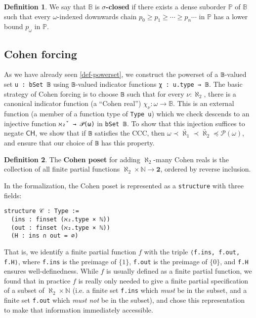 \documentclass[sigplan,10pt,review, anonymous]{acmart}
\newcommand{\B}{\mathbb{B}}
\newcommand{\lil}{\lstinline}
\newcommand{\CH}{\mathsf{CH}}
\theoremstyle{definition}
\newtheorem{defn}{Definition}[section]
\begin{document}
\begin{defn}\label{def-sigma-closed}
We say that \(\B\) is \textbf{\(\sigma\)-closed} if there exists a dense suborder \(\mathbb{P}\) of \(\B\) such that every \(\omega\)-indexed downwards chain \(p_0 \geq p_1 \geq \cdots \geq p_n \cdots\) in \(\mathbb{P}\) has a lower bound \(p_{\omega}\) in \(\mathbb{P}\).
\end{defn}

\subsection{Cohen forcing}

As we have already seen \ref{def-powerset}, we construct the powerset of a \lil{𝔹}-valued set \lstinline{u : bSet 𝔹} using \lil{𝔹}-valued indicator functions \lil{χ : u.type → 𝔹}. The basic strategy of Cohen forcing is to choose \lil{𝔹} such that for every \(\nu : \aleph_2\), there is a canonical indicator function (a ``Cohen real'') \(\chi_{\nu} : \omega \to \mathbb{B}\). This is an external function (a member of a function type of \lstinline{Type u}) which we check descends to an injective function \lil{ℵ₂̌  → 𝒫(ω)} in \lil{bSet 𝔹}. To show that this injection suffices to negate \(\CH\), we show that if \lil{𝔹} satisfies the CCC, then \(\omega \prec \check{\aleph_1} \prec \check{\aleph_2} \preceq \mathcal{P}(\omega)\), and ensure that our choice of \lil{𝔹} has this property.

\begin{defn}
  The \textbf{Cohen poset} for adding $\aleph_2$-many Cohen reals is the collection of all finite partial functions $\aleph_2 \times \mathbb{N} \to \mathbf{2}$, ordered by reverse inclusion.
\end{defn}

In the formalization, the Cohen poset is represented as a \lstinline{structure} with three fields:
\begin{lstlisting}
structure 𝒞 : Type :=
  (ins : finset (ℵ₂.type × ℕ))
  (out : finset (ℵ₂.type × ℕ))
  (H : ins ∩ out = ∅)
\end{lstlisting}

That is, we identify a finite partial function $f$ with the triple \lil{⟨f.ins, f.out, f.H⟩}, where \lil{f.ins} is the preimage of $\{1\}$, \lil{f.out} is the preimage of $\{0\}$, and \lil{f.H} ensures well-definedness. While $f$ is usually defined as a finite partial function, we found that in practice $f$ is really only needed to give a finite partial specification of a subset of $\aleph_2 \times \mathbb{N}$ (i.e. a finite set \lil{f.ins} which \emph{must} be in the subset, and a finite set \lil{f.out} which \emph{must not} be in the subset), and chose this representation to make that information immediately accessible.
\end{document}
